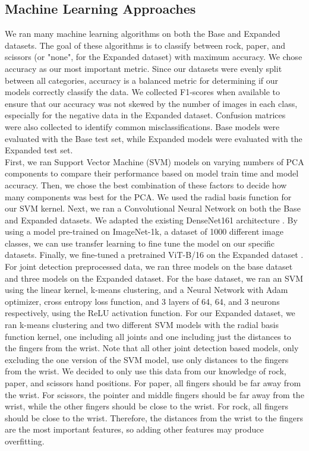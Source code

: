\documentclass{article}
\begin{document}
\subsection{Machine Learning Approaches}
We ran many machine learning algorithms on both the Base and Expanded datasets. The goal of these algorithms is to classify between rock, paper, and scissors (or "none", for the Expanded dataset) with maximum accuracy. We chose accuracy as our most important metric. Since our datasets were evenly split between all categories, accuracy is a balanced metric for determining if our models correctly classify the data. We collected F1-scores when available to ensure that our accuracy was not skewed by the number of images in each class, especially for the negative data in the Expanded dataset. Confusion matrices were also collected to identify common misclassifications. Base models were evaluated with the Base test set, while Expanded models were evaluated with the Expanded test set. \\
First, we ran Support Vector Machine (SVM) models on varying numbers of PCA components to compare their performance based on model train time and model accuracy. Then, we chose the best combination of these factors to decide how many components was best for the PCA. We used the radial basis function for our SVM kernel. Next, we ran a Convolutional Neural Network on both the Base and Expanded datasets. We adapted the existing DenseNet161 architecture \cite{densenet}. By using a model pre-trained on ImageNet-1k, a dataset of 1000 different image classes, we can use transfer learning to fine tune the model on our specific datasets. Finally, we fine-tuned a pretrained ViT-B/16 on the Expanded dataset \cite{vit}. \\
For joint detection preprocessed data, we ran three models on the base dataset and three models on the Expanded dataset. For the base dataset, we ran an SVM using the linear kernel, k-means clustering, and a Neural Network with Adam optimizer, cross entropy loss function, and 3 layers of 64, 64, and 3 neurons respectively, using the ReLU activation function. For our Expanded dataset, we ran k-means clustering and two different SVM models with the radial basis function kernel, one including all joints and one including just the distances to the fingers from the wrist. Note that all other joint detection based models, only excluding the one version of the SVM model, use only distances to the fingers from the wrist. We decided to only use this data from our knowledge of rock, paper, and scissors hand positions. For paper, all fingers should be far away from the wrist. For scissors, the pointer and middle fingers should be far away from the wrist, while the other fingers should be close to the wrist. For rock, all fingers should be close to the wrist. Therefore, the distances from the wrist to the fingers are the most important features, so adding other features may produce overfitting. \\
\end{document}
